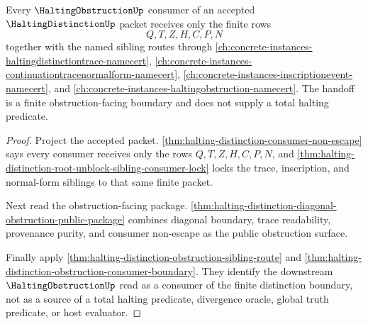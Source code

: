 \begin{theorem}
\label{thm:halting-distinction-downstream-obstruction-handoff}
Every $\HaltingObstructionUp$ consumer of an accepted $\HaltingDistinctionUp$ packet receives only the finite rows
$$
Q,T,Z,H,C,P,N
$$
together with the named sibling routes through \autoref{ch:concrete-instances-haltingdistinctiontrace-namecert}, \autoref{ch:concrete-instances-continuationtracenormalform-namecert}, \autoref{ch:concrete-instances-inscriptionevent-namecert}, and \autoref{ch:concrete-instances-haltingobstruction-namecert}. The handoff is a finite obstruction-facing boundary and does not supply a total halting predicate.
\end{theorem}
\begin{proof}
Project the accepted packet. \autoref{thm:halting-distinction-consumer-non-escape} says every consumer receives only the rows $Q,T,Z,H,C,P,N$, and \autoref{thm:halting-distinction-root-unblock-sibling-consumer-lock} locks the trace, inscription, and normal-form siblings to that same finite packet.

Next read the obstruction-facing package. \autoref{thm:halting-distinction-diagonal-obstruction-public-package} combines diagonal boundary, trace readability, provenance purity, and consumer non-escape as the public obstruction surface.

Finally apply \autoref{thm:halting-distinction-obstruction-sibling-route} and \autoref{thm:halting-distinction-obstruction-consumer-boundary}. They identify the downstream $\HaltingObstructionUp$ read as a consumer of the finite distinction boundary, not as a source of a total halting predicate, divergence oracle, global truth predicate, or host evaluator.
\end{proof}

